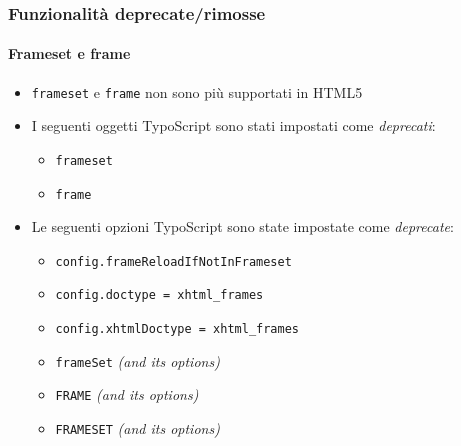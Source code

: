 \begin{frame}[fragile]
	\frametitle{Funzionalità deprecate/rimosse}
	\framesubtitle{Frameset e frame}

	\begin{itemize}
		\item \texttt{frameset} e \texttt{frame} non sono più supportati in HTML5
		\item I seguenti oggetti TypoScript sono stati impostati come \textit{deprecati}:

			\begin{itemize}
				\item \texttt{frameset}
				\item \texttt{frame}
			\end{itemize}

		\item Le seguenti opzioni TypoScript sono state impostate come \textit{deprecate}:

			\begin{itemize}
				\item \texttt{config.frameReloadIfNotInFrameset}
				\item \texttt{config.doctype = xhtml\_frames}
				\item \texttt{config.xhtmlDoctype = xhtml\_frames}
				\item \texttt{frameSet} \tabto{1.8cm}\textit{(and its options)}
				\item \texttt{FRAME} \tabto{1.8cm}\textit{(and its options)}
				\item \texttt{FRAMESET} \tabto{1.8cm}\textit{(and its options)}
			\end{itemize}

	\end{itemize}

\end{frame}






